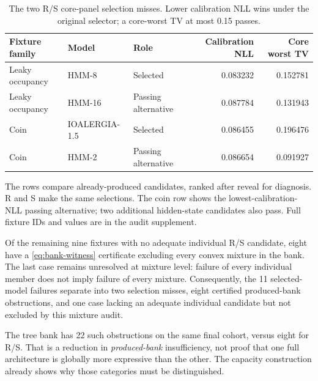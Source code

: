 \begin{table}[tbp]
\centering
\caption{The two R/S core-panel selection misses. Lower calibration NLL wins under the original selector; a core-worst TV at most 0.15 passes.}\label{tab:selection-misses}
\footnotesize
\setlength{\tabcolsep}{5pt}
\begin{tabular}{lllrr}
\toprule
Fixture family & Model & Role & Calibration NLL & Core worst TV \\
\midrule
Leaky occupancy & HMM-8 & Selected & 0.083232 & 0.152781 \\
Leaky occupancy & HMM-16 & Passing alternative & 0.087784 & 0.131943 \\
Coin & IOALERGIA-1.5 & Selected & 0.086455 & 0.196476 \\
Coin & HMM-2 & Passing alternative & 0.086654 & 0.091927 \\
\bottomrule
\end{tabular}
\par\smallskip\begin{minipage}{\linewidth}\footnotesize The rows compare already-produced candidates, ranked after reveal for diagnosis. R and S make the same selections. The coin row shows the lowest-calibration-NLL passing alternative; two additional hidden-state candidates also pass. Full fixture IDs and values are in the audit supplement.\end{minipage}
\end{table}



Of the remaining nine fixtures with no adequate individual R/S candidate, eight have a \cref{eq:bank-witness} certificate excluding every convex mixture in the bank. The last case remains unresolved at mixture level: failure of every individual member does not imply failure of every mixture. Consequently, the 11 selected-model failures separate into two selection misses, eight certified produced-bank obstructions, and one case lacking an adequate individual candidate but not excluded by this mixture audit.

The tree bank has 22 such obstructions on the same final cohort, versus eight for R/S. That is a reduction in \emph{produced-bank} insufficiency, not proof that one full architecture is globally more expressive than the other. The capacity construction already shows why those categories must be distinguished.


